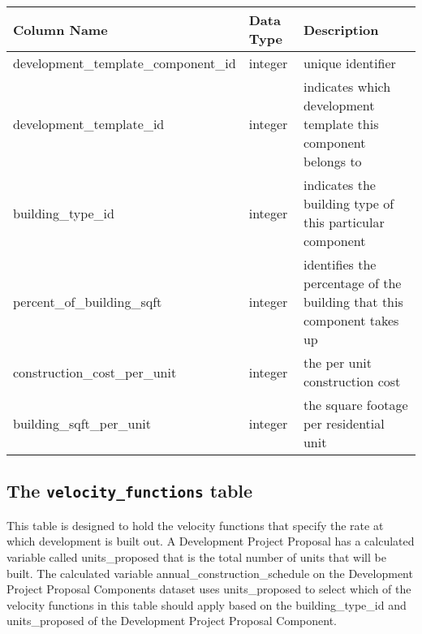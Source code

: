 \begin{tabular}{p{2.3in}lp{3.2in}}
\textbf{Column Name} & \textbf{Data Type} & \textbf{Description} \\
\hline
development\_template\_component\_id & integer & unique identifier\\ \hline
development\_template\_id & integer & indicates which development template this component belongs to\\ \hline
building\_type\_id & integer & indicates the building type of this particular component\\ \hline
percent\_of\_building\_sqft & integer & identifies the percentage of the building that this component takes up\\
construction\_cost\_per\_unit & integer & the per unit construction cost\\ \hline
building\_sqft\_per\_unit & integer & the square footage per residential unit \\ \hline
\end{tabular}

\subsection{The {\tt velocity\_functions} table}
\label{sec:db-tables-velocity-functions}

This table is designed to hold the velocity functions that specify the rate at which development is built out.  A Development Project Proposal has a calculated variable called units_proposed that is the total number of units that will be built.  The calculated variable annual_construction_schedule on the Development Project Proposal Components dataset uses units_proposed to select which of the velocity functions in this table should apply
based on the building_type_id and units_proposed of the Development Project Proposal Component.


